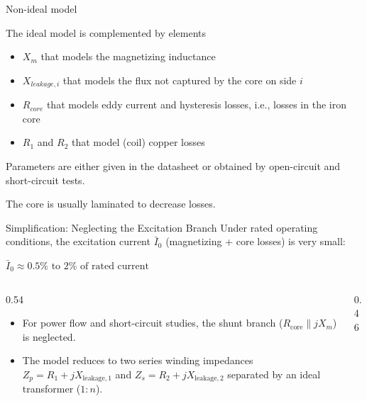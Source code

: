 \begin{frame}[allowframebreaks]{Non-ideal model}

\begin{center}
   
\end{center}
\newpage 
The ideal model is complemented by elements 
\begin{itemize}
    \item $X_m$ that models the magnetizing inductance
    \item $X_{leakage, i}$ that models the flux not captured by the core on side $i$
    \item $R_{core}$ that models eddy current and hysteresis losses, i.e., losses in the iron core
    \item $R_{1}$ and $R_{2}$ that model (coil) copper losses
\end{itemize}

Parameters are either given in the datasheet or obtained by open-circuit and short-circuit tests.

The core is usually \alert{laminated}  to decrease losses.
\end{frame}

\begin{frame}{Simplification: Neglecting the Excitation Branch}
    Under rated operating conditions, the excitation current $\bar{I}_0$ (magnetizing + core losses) is very small:
    \begin{center}
        $\bar{I}_0 \approx 0.5\%\text{ to }2\% \text{ of rated current}$
    \end{center}
    \begin{columns}
\begin{column}{0.54\textwidth}
    \begin{itemize}
        \item For power flow and short-circuit studies, the shunt branch ($R_{\text{core}} \parallel jX_m$) is \alert{neglected}.
        \item The model reduces to two series winding impedances $Z_p = R_1 + jX_{\text{leakage}, 1}$ and $Z_s = R_2 + jX_{\text{leakage}, 2}$ separated by an ideal transformer ($1:n$).
    \end{itemize}
\end{column}
\begin{column}{0.46\textwidth}
    \centering
    
\end{column}
\end{columns}
\end{frame}

